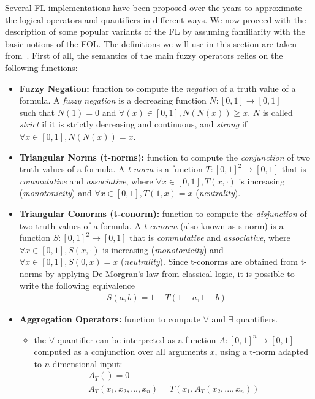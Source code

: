 Several FL implementations have been proposed over the years to approximate the logical operators and quantifiers in different ways. We now proceed with the description of some popular variants of the FL by assuming familiarity with the basic notions of the FOL. The definitions we will use in this section are taken from~\cite{analyzingDiffFuzzyLogic}. First of all, the semantics of the main fuzzy operators relies on the following functions:
\begin{itemize}
    \item \textbf{Fuzzy Negation:} function to compute the \textit{negation} of a truth value of a formula. A \textit{fuzzy negation} is a decreasing function $ N:[0,1]\rightarrow [0,1] $ \\
    such that $ N(1)=0 $ and $ \forall (x)\in [0,1], N(N(x)) \geq x $. $N$ is called \textit{strict} if it is strictly decreasing and continuous, and \textit{strong} if \\$\forall x \in [0,1], N(N(x))=x$. %
    
    \item \textbf{Triangular Norms (t-norms):} function to compute the \textit{conjunction} of two truth values of a formula. A \textit{t-norm} is a function $ T:[0,1]^{2}\rightarrow [0,1] $ that is \textit{commutative} and \textit{associative}, where $\forall x \in [0,1], T(x,\cdot)$ is increasing (\textit{monotonicity}) and $\forall x \in [0,1], T(1,x)=x$ (\textit{neutrality}).
    
    \item \textbf{Triangular Conorms (t-conorm):} function to compute the \textit{disjunction} of two truth values of a formula. A \textit{t-conorm} (also known as s-norm) is a function $S:[0,1]^{2} \rightarrow [0,1] $ that is \textit{commutative} and \textit{associative}, where $\forall x \in [0,1], S(x,\cdot)$ is increasing (\textit{monotonicity}) and $\forall x \in [0,1], S(0,x)=x$ (\textit{neutrality}). Since t-conorms are obtained from t-norms by applying De Morgran's law from classical logic, it is possible to write the following equivalence
    \begin{gather*}
        S(a, b) = 1 - T(1 - a, 1 - b)
    \end{gather*}
    
    \item \textbf{Aggregation Operators:} function to compute $\forall$ and $\exists$ quantifiers. 
    \begin{itemize}
        \item the $\forall$ quantifier can be interpreted as a function $A:[0,1]^{n} \rightarrow [0,1] $ computed as a conjunction over all arguments $x$, using a t-norm adapted to $n$-dimensional input:
        \begin{gather*}
            A_{T}()=0 \\
            A_{T}(x_{1},x_{2},...,x_{n}) = T(x_{1},A_{T}(x_{2},...,x_{n}))
        \end{gather*}
        

\end{itemize}
\end{itemize}
